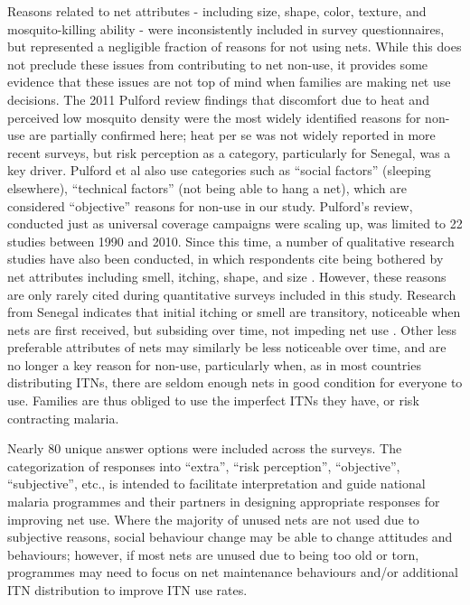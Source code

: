 \documentclass[review,
3p]{elsarticle} %
\begin{document}
Reasons related to net attributes - including size, shape, color,
texture, and mosquito-killing ability - were inconsistently included in
survey questionnaires, but represented a negligible fraction of reasons
for not using nets. While this does not preclude these issues from
contributing to net non-use, it provides some evidence that these issues
are not top of mind when families are making net use decisions. The 2011
Pulford review findings \citep{Pulford:2011dc} that discomfort due to
heat and perceived low mosquito density were the most widely identified
reasons for non-use are partially confirmed here; heat per se was not
widely reported in more recent surveys, but risk perception as a
category, particularly for Senegal, was a key driver. Pulford et al also
use categories such as ``social factors'' (sleeping elsewhere),
``technical factors'' (not being able to hang a net), which are
considered ``objective'' reasons for non-use in our study. Pulford's
review, conducted just as universal coverage campaigns were scaling up,
was limited to 22 studies between 1990 and 2010. Since this time, a
number of qualitative research studies have also been conducted, in
which respondents cite being bothered by net attributes including smell,
itching, shape, and size
\citep{Mattern:2016dp, Berthe:2014ja, Sande:2012vb, Galvin:2011ea}.
However, these reasons are only rarely cited during quantitative surveys
included in this study. Research from Senegal indicates that initial
itching or smell are transitory, noticeable when nets are first
received, but subsiding over time, not impeding net use
\citep{Berthe:2014ja}. Other less preferable attributes of nets may
similarly be less noticeable over time, and are no longer a key reason
for non-use, particularly when, as in most countries distributing ITNs,
there are seldom enough nets in good condition for everyone to use.
Families are thus obliged to use the imperfect ITNs they have, or risk
contracting malaria.

Nearly 80 unique answer options were included across the surveys. The
categorization of responses into ``extra'', ``risk perception'',
``objective'', ``subjective'', etc., is intended to facilitate
interpretation and guide national malaria programmes and their partners
in designing appropriate responses for improving net use. Where the
majority of unused nets are not used due to subjective reasons, social
behaviour change may be able to change attitudes and behaviours;
however, if most nets are unused due to being too old or torn,
programmes may need to focus on net maintenance behaviours and/or
additional ITN distribution to improve ITN use rates.
\end{document}
